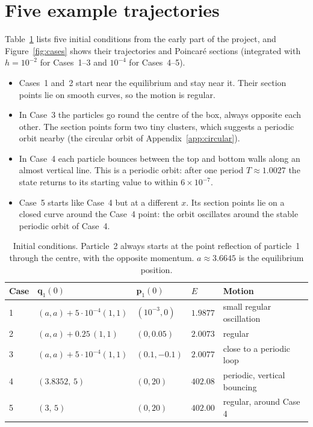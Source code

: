 \documentclass[11pt,a4paper]{article}
\newcommand{\q}{\mathbf{q}}
\newcommand{\p}{\mathbf{p}}
\begin{document}
\section{Five example trajectories}\label{app:cases}
Table~\ref{tab:cases} lists five initial conditions from the early part of
the project, and Figure~\ref{fig:cases} shows their trajectories and
Poincar\'e sections (integrated with $h=10^{-2}$ for Cases~1--3 and $10^{-4}$
for Cases~4--5).
\begin{itemize}
  \item Cases~1 and~2 start near the equilibrium and stay near it. Their
        section points lie on smooth curves, so the motion is regular.
  \item In Case~3 the particles go round the centre of the box, always
        opposite each other. The section points form two tiny clusters, which
        suggests a periodic orbit nearby (the circular orbit of
        Appendix~\ref{app:circular}).
  \item In Case~4 each particle bounces between the top and bottom walls along
        an almost vertical line. This is a periodic orbit: after one period
        $T\approx1.0027$ the state returns to its starting value to within
        $6\times10^{-7}$.
  \item Case~5 starts like Case~4 but at a different $x$. Its section points
        lie on a closed curve around the Case~4 point: the orbit oscillates
        around the stable periodic orbit of Case~4.
\end{itemize}

\begin{table}[H]
\centering
\caption{Initial conditions. Particle~2 always starts at the point reflection
of particle~1 through the centre, with the opposite momentum. $a\approx3.6645$
is the equilibrium position.}
\label{tab:cases}
\begin{tabular}{@{}lllll@{}}
\toprule
Case & $\q_1(0)$ & $\p_1(0)$ & $E$ & Motion\\
\midrule
1 & $(a,a)+5\cdot10^{-4}(1,1)$ & $(10^{-3},0)$ & $1.9877$ & small regular oscillation\\
2 & $(a,a)+0.25\,(1,1)$ & $(0,0.05)$ & $2.0073$ & regular\\
3 & $(a,a)+5\cdot10^{-4}(1,1)$ & $(0.1,-0.1)$ & $2.0077$ & close to a periodic loop\\
4 & $(3.8352,\,5)$ & $(0,20)$ & $402.08$ & periodic, vertical bouncing\\
5 & $(3,\,5)$ & $(0,20)$ & $402.00$ & regular, around Case 4\\
\bottomrule
\end{tabular}
\end{table}
\end{document}
